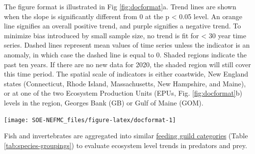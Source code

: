 \documentclass[
  10pt,
]{article}
\let\origfigure\figure
\let\endorigfigure\endfigure
\renewenvironment{figure}[1][2] {
    \expandafter\origfigure\expandafter[H]
} {
    \endorigfigure
}
\begin{document}
The figure format is illustrated in Fig \ref{fig:docformat}a. Trend lines are shown when the slope is significantly different from 0 at the p \textless{} 0.05 level. An orange line signifies an overall positive trend, and purple signifies a negative trend. To minimize bias introduced by small sample size, no trend is fit for \textless{} 30 year time series. Dashed lines represent mean values of time series unless the indicator is an anomaly, in which case the dashed line is equal to 0. Shaded regions indicate the past ten years. If there are no new data for 2020, the shaded region will still cover this time period. The spatial scale of indicators is either coastwide, New England states (Connecticut, Rhode Island, Massachusetts, New Hampshire, and Maine), or at one of the two Ecosystem Production Units (EPUs, Fig. \ref{fig:docformat}b) levels in the region, Georges Bank (GB) or Gulf of Maine (GOM).

\begin{figure}

{\centering \texttt{[image: SOE-NEFMC\_files/figure-latex/docformat-1]} 

}

\caption{Document orientation. a. Key to figures. b.The Northeast Large Marine Ecosystem.}\label{fig:docformat}
\end{figure}

Fish and invertebrates are aggregated into similar \href{https://noaa-edab.github.io/catalog/feeding-guilds-by-management-bodies.html}{feeding guild categories} (Table \ref{tab:species-groupings}) to evaluate ecosystem level trends in predators and prey.

\providecommand{\docline}[3]{\noalign{\global\setlength{\arrayrulewidth}{#1}}\arrayrulecolor[HTML]{#2}\cline{#3}}

\setlength{\tabcolsep}{2pt}

\renewcommand*{\arraystretch}{1.5}
\end{document}
